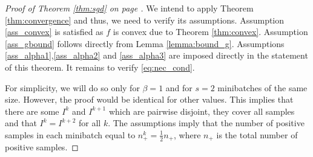 \sgd*
\begin{proof}[Proof of Theorem \ref{thm:sgd} on page \pageref{thm:sgd}]
  We intend to apply Theorem \ref{thm:convergence} and thus, we need to verify its assumptions. Assumption \ref{ass_convex} is satisfied as $f$ is convex due to Theorem \ref{thm:convex}. Assumption \ref{ass_gbound} follows directly from Lemma \ref{lemma:bound_g}. Assumptions \ref{ass_alpha1},\ref{ass_alpha2} and \ref{ass_alpha3} are imposed directly in the statement of this theorem. It remains to verify \eqref{eq:nec_cond}.

  For simplicity, we will do so only for $\beta=1$ and for $s=2$ minibatches of the same size. However, the proof would be identical for other values. This implies that there are some $I^k$ and $I^{k+1}$ which are pairwise disjoint, they cover all samples and that $I^k=I^{k+2}$ for all $k$. The assumptions imply that the number of positive samples in each minibatch equal to $n_+^k=\frac{1}{2}n_+$, where $n_+$ is the total number of positive samples.


\end{proof}
